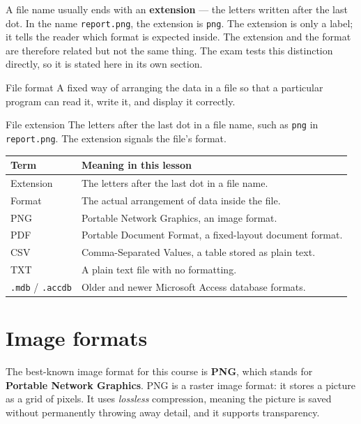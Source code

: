 A file name usually ends with an \textbf{extension} --- the letters written
after the last dot. In the name \texttt{report.png}, the extension is
\texttt{png}. The extension is only a label; it tells the reader which format
is expected inside. The extension and the format are therefore related but
not the same thing. The exam tests this distinction directly, so it is stated
here in its own section.

\begin{definitionbox}{File format}
A fixed way of arranging the data in a file so that a particular program can
read it, write it, and display it correctly.
\end{definitionbox}

\begin{definitionbox}{File extension}
The letters after the last dot in a file name, such as \texttt{png} in
\texttt{report.png}. The extension signals the file's format.
\end{definitionbox}

\begin{center}
\begin{tabular}{p{}p{}}
\toprule
\textbf{Term} & \textbf{Meaning in this lesson} \\
\midrule
Extension & The letters after the last dot in a file name. \\
Format & The actual arrangement of data inside the file. \\
PNG & Portable Network Graphics, an image format. \\
PDF & Portable Document Format, a fixed-layout document format. \\
CSV & Comma-Separated Values, a table stored as plain text. \\
TXT & A plain text file with no formatting. \\
\texttt{.mdb} / \texttt{.accdb} & Older and newer Microsoft Access database formats. \\
\bottomrule
\end{tabular}
\end{center}

\section{Image formats}
The best-known image format for this course is \textbf{PNG}, which stands for
\textbf{Portable Network Graphics}. PNG is a raster image format: it stores a
picture as a grid of pixels. It uses \emph{lossless} compression, meaning the
picture is saved without permanently throwing away detail, and it supports
transparency.

